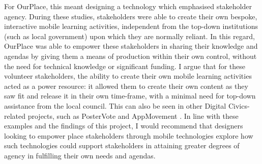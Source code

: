 For OurPlace, this meant designing a technology which emphasised stakeholder agency. During these studies, stakeholders were able to create their own bespoke, interactive mobile learning activities, independent from the top-down institutions (such as local government) upon which they are normally reliant. In this regard, OurPlace was able to empower these stakeholders in sharing their knowledge and agendas by giving them a means of production within their own control, without the need for technical knowledge or significant funding. I argue that for these volunteer stakeholders, the ability to create their own mobile learning activities acted as a power resource: it allowed them to create their own content as they saw fit and release it in their own time-frame, with a minimal need for top-down assistance from the local council. This can also be seen in other Digital Civics-related projects, such as PosterVote \citep{Vlachokyriakos2014} and AppMovement \citep{Garbett2016}. In line with these examples and the findings of this project, I would recommend that designers looking to empower place stakeholders through mobile technologies explore how such technologies could support stakeholders in attaining greater degrees of agency in fulfilling their own needs and agendas.